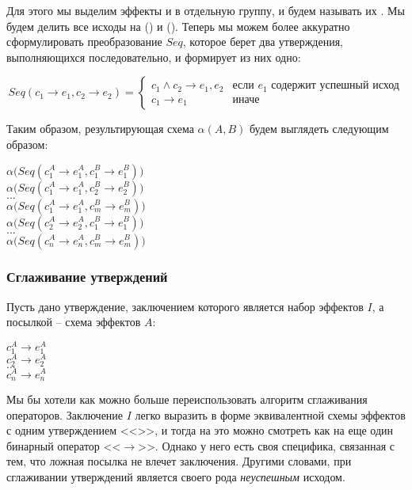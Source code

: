 Для этого мы выделим эффекты  и  в отдельную группу, и будем называть их . Мы будем делить все исходы на  () и  (). Теперь мы можем более аккуратно сформулировать преобразование $Seq$, которое берет два утверждения, выполняющихся последовательно, и формирует из них одно:

\[
Seq(c_1 \rightarrow e_1, c_2 \rightarrow e_2) = 
\begin{cases}
c_1 \land c_2 \rightarrow e_1, e_2 & \text{если } e_1 \text{ содержит успешный исход} \\
c_1 \rightarrow e_1 			   & \text{иначе}
\end{cases}
\]

Таким образом, результирующая схема $\alpha(A, B)$ будем выглядеть следующим образом:

{
	 $\alpha\Big(Seq (c^A_1 \rightarrow e^A_1, c^B_1 \rightarrow e^B_1) \Big)$ \\
	 $\alpha\Big(Seq (c^A_1 \rightarrow e^A_1, c^B_2 \rightarrow e^B_2) \Big)$ \\
	 $\ldots$ \\
	 $\alpha\Big(Seq (c^A_1 \rightarrow e^A_1, c^B_m \rightarrow e^B_m) \Big)$ \\
	 $\alpha\Big(Seq (c^A_2 \rightarrow e^A_2, c^B_1 \rightarrow e^B_1) \Big)$ \\
	 $\ldots$ \\
	 $\alpha\Big(Seq (c^A_n \rightarrow e^A_n, c^B_m \rightarrow e^B_m) \Big)$ \\
}
{}


\subsubsection{Сглаживание утверждений}

Пусть дано утверждение, заключением которого является набор эффектов $I$, а посылкой -- схема эффектов $A$:

{
	$c^A_1 \rightarrow e^A_1$ \\
	$c^A_2 \rightarrow e^A_2$ \\
	$\ldots$ \\
	$c^A_n \rightarrow e^A_n$ \\
}{}

Мы бы хотели как можно больше переиспользовать алгоритм сглаживания операторов. Заключение $I$ легко выразить в форме эквивалентной схемы эффектов с одним утверждением <<>>, и тогда на это можно смотреть как на еще один бинарный оператор <<$\rightarrow$>>. Однако у него есть своя специфика, связанная с тем, что ложная посылка не влечет заключения. Другими словами, при сглаживании утверждений  является своего рода \emph{неуспешным} исходом. 

